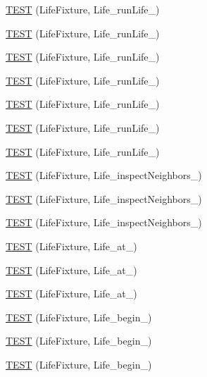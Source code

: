 \begin{DoxyCompactItemize}
\item 
\hyperlink{TestLife_8c_09_09_a861b8a08af6bab7b3ca744088149874c}{T\-E\-S\-T} (Life\-Fixture, Life\-\_\-run\-Life\-\_)
\item 
\hyperlink{TestLife_8c_09_09_a1fbb3b7d1e770cdf6cd51743d98e6c1d}{T\-E\-S\-T} (Life\-Fixture, Life\-\_\-run\-Life\-\_)
\item 
\hyperlink{TestLife_8c_09_09_a703c71f56eba3a02247136e8b134c132}{T\-E\-S\-T} (Life\-Fixture, Life\-\_\-run\-Life\-\_)
\item 
\hyperlink{TestLife_8c_09_09_ab4cd2e0ecf194ba8e81ecc40cd03d6d3}{T\-E\-S\-T} (Life\-Fixture, Life\-\_\-run\-Life\-\_)
\item 
\hyperlink{TestLife_8c_09_09_ab3f3883006ccf3c30e85a81c393cec03}{T\-E\-S\-T} (Life\-Fixture, Life\-\_\-run\-Life\-\_)
\item 
\hyperlink{TestLife_8c_09_09_a8e45bcf04f5d97a25778bd55efa227e7}{T\-E\-S\-T} (Life\-Fixture, Life\-\_\-run\-Life\-\_)
\item 
\hyperlink{TestLife_8c_09_09_a833120c4d9756bee79bb8909dc537b03}{T\-E\-S\-T} (Life\-Fixture, Life\-\_\-run\-Life\-\_)
\item 
\hyperlink{TestLife_8c_09_09_a76cb66f1e2aa8004bdbcbff6abbca5f2}{T\-E\-S\-T} (Life\-Fixture, Life\-\_\-inspect\-Neighbors\-\_)
\item 
\hyperlink{TestLife_8c_09_09_a9b892172462ef8ee35313d8d7a26b0f4}{T\-E\-S\-T} (Life\-Fixture, Life\-\_\-inspect\-Neighbors\-\_)
\item 
\hyperlink{TestLife_8c_09_09_a5fc1f31dc4d44113f2c60fee2e343440}{T\-E\-S\-T} (Life\-Fixture, Life\-\_\-inspect\-Neighbors\-\_)
\item 
\hyperlink{TestLife_8c_09_09_a8bd1e2a67cb6e4218ca0edded334ae86}{T\-E\-S\-T} (Life\-Fixture, Life\-\_\-at\-\_)
\item 
\hyperlink{TestLife_8c_09_09_afb4b123c70f9d4be1df882aa4d43a6d8}{T\-E\-S\-T} (Life\-Fixture, Life\-\_\-at\-\_)
\item 
\hyperlink{TestLife_8c_09_09_a5790d0b0c8a9f0295482b3454fb997c7}{T\-E\-S\-T} (Life\-Fixture, Life\-\_\-at\-\_)
\item 
\hyperlink{TestLife_8c_09_09_af1fe5d1564e530f32a7a342fffa1be64}{T\-E\-S\-T} (Life\-Fixture, Life\-\_\-begin\-\_)
\item 
\hyperlink{TestLife_8c_09_09_aa0b0ec4c88d4e6f2d6fb8501b5d730a7}{T\-E\-S\-T} (Life\-Fixture, Life\-\_\-begin\-\_)
\item 
\hyperlink{TestLife_8c_09_09_a51b6c2f01f202a0308694807aa8a8be9}{T\-E\-S\-T} (Life\-Fixture, Life\-\_\-begin\-\_)

\end{DoxyCompactItemize}
